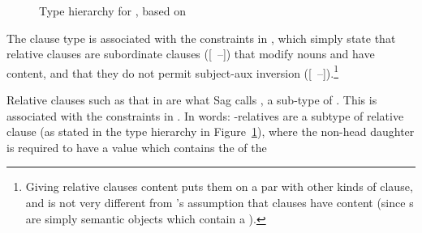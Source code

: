 \documentclass[output=paper
 	        ,biblatex
                ,babelshorthands
                ,newtxmath
                ,draftmode
                ,colorlinks, citecolor=brown
]{langscibook}
\begin{document}
\begin{figure}
  \usebox{\RelcHierarchyDA}
  \caption{Type hierarchy for {\protect{}}, based on \cite{Sag:97}}
  \label{fig:rc-42}
\end{figure}
The  clause type is associated with the constraints in , which
simply state that relative clauses are subordinate clauses ([~{--}]) that
modify nouns and have 
content, and that they do not permit
subject-aux inversion ([~{--}]).\footnote{Giving relative clauses
   content puts them on a par with other kinds of clause, and is not
  very different from \citeauthor{Pollard:Sag:94}'s assumption that clauses have
   content (since s are simply semantic objects which contain a ).}
\begin{exe}\ex\label{x:rc-44}
\end{exe}
Relative clauses such as that in  are what Sag calls
, a sub-type of . This is associated with the
constraints in . In words: -relatives are a subtype of relative clause
(as stated in the type hierarchy in Figure~\ref{fig:rc-42}), where the non-head daughter is
required to have a  value which contains the  of the
\end{document}
